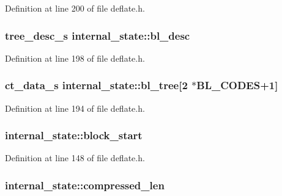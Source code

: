 Definition at line 200 of file deflate.\-h.

\hypertarget{structinternal__state_aa0e5da102c35a7e7d22dd1894039393b}{
\subsubsection[{bl\-\_\-desc}]{ {\bf tree\-\_\-desc\-\_\-s} internal\-\_\-state\-::bl\-\_\-desc}}\label{structinternal__state_aa0e5da102c35a7e7d22dd1894039393b}


Definition at line 198 of file deflate.\-h.

\hypertarget{structinternal__state_a98131fc5b64d0d7542bc3621aef19854}{
\subsubsection[{bl\-\_\-tree}]{ {\bf ct\-\_\-data\-\_\-s} internal\-\_\-state\-::bl\-\_\-tree\mbox{[}2 $\ast$B\-L\-\_\-\-C\-O\-D\-E\-S+1\mbox{]}}}\label{structinternal__state_a98131fc5b64d0d7542bc3621aef19854}


Definition at line 194 of file deflate.\-h.

\hypertarget{structinternal__state_a4ba16849758dfa969066693ca2cae880}{
\subsubsection[{block\-\_\-start}]{ internal\-\_\-state\-::block\-\_\-start}}\label{structinternal__state_a4ba16849758dfa969066693ca2cae880}


Definition at line 148 of file deflate.\-h.

\hypertarget{structinternal__state_af62d9cb9d4c3c1b98a650eac93407893}{
\subsubsection[{compressed\-\_\-len}]{ internal\-\_\-state\-::compressed\-\_\-len}}\label{structinternal__state_af62d9cb9d4c3c1b98a650eac93407893}


